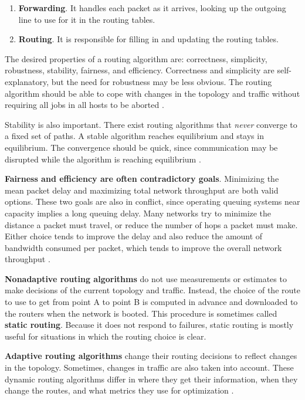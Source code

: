 \begin{enumerate}
    \item \textbf{Forwarding}.
    It handles each packet as it arrives, looking up the outgoing line to use for it in the routing tables.
    \item \textbf{Routing}.
    It is responsible for filling in and updating the routing tables.
\end{enumerate}

The desired properties of a routing algorithm are: correctness, simplicity, robustness, stability, fairness, and efficiency.
Correctness and simplicity are self-explanatory, but the need for robustness may be less obvious.
The routing algorithm should be able to cope with changes in the topology and traffic without requiring all jobs in all hosts to be aborted \cite[p.~363]{computer-networks-tanenbaum-2012}.

Stability is also important. There exist routing algorithms that \textit{never} converge to a fixed set of paths.
A stable algorithm reaches equilibrium and stays in equilibrium.
The convergence should be quick, since communication may be disrupted while the algorithm is reaching equilibrium \cite[p.~363]{computer-networks-tanenbaum-2012}.

\textbf{Fairness and efficiency are often contradictory goals}.
Minimizing the mean packet delay and maximizing total network throughput are both valid options.
These two goals are also in conflict, since operating queuing systems near capacity implies a long queuing delay.
Many networks try to minimize the distance a packet must travel, or reduce the number of hops a packet must make.
Either choice tends to improve the delay and also reduce the amount of bandwidth consumed per packet, which tends to improve the overall network throughput \cite[p.~363]{computer-networks-tanenbaum-2012}.

\textbf{Nonadaptive routing algorithms} do not use measurements or estimates to make decisions of the current topology and traffic.
Instead, the choice of the route to use to get from point A to point B is computed in advance and downloaded to the routers when the network is booted.
This procedure is sometimes called \textbf{static routing}.
Because it does not respond to failures, static routing is mostly useful for situations in which the routing choice is clear.

\textbf{Adaptive routing algorithms} change their routing decisions to reflect changes in the topology.
Sometimes, changes in traffic are also taken into account.
These dynamic routing algorithms differ in where they get their information, when they change the routes, and what metrics they use for optimization \cite[p.~364]{computer-networks-tanenbaum-2012}.

